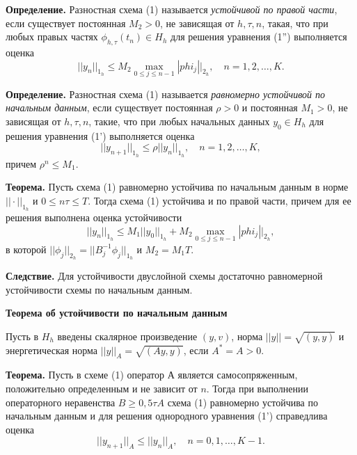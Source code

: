\textbf{Определение.}
Разностная схема (1) называется \textit{устойчивой по правой части}, если существует постоянная $M_2>0$, не зависящая от  $h,\tau ,n$, такая, что при любых правых частях $\phi_{h,\tau}(t_n) \in H_h$ для решения уравнения (1'') выполняется оценка
\begin{equation} \nonumber
||y_n||_{1_h} \leq M_2  \max_{0 \leq j \leq n-1} |phi_j||_{2_h}, \quad n=1,2,\dots ,K.
\end{equation}

\textbf{Определение.}
Разностная схема (1) называется \textit{равномерно устойчивой по начальным данным}, если существует постоянная $\rho>0$ и постоянная $M_1>0$, не зависящая от  $h,\tau ,n$, такие, что при любых начальных данных $y_0 \in H_h$ для решения уравнения (1') выполняется оценка
\begin{equation} \nonumber
||y_{n+1}||_{1_h} \leq \rho ||y_n||_{1_h}, \quad n=1,2,\dots ,K,
\end{equation}
причем $\rho^n \leq M_1.$

\textbf{Теорема.}
Пусть схема (1) равномерно устойчива по начальным данным в норме $||\cdot||_{1_h}$ и $0 \leq n\tau \leq T$. Тогда схема (1) устойчива и по правой части, причем для ее решения выполнена оценка устойчивости
\begin{equation} \nonumber
||y_n||_{1_h} \leq M_1 ||y_0||_{1_h} + M_2  \max_{0 \leq j \leq n-1} |phi_j||_{2_h},
\end{equation}
в которой $||\phi_j||_{2_h} = ||B_j^{-1} \phi_j||_{1_h}$ и $M_2=M_1 T$.

\textbf{Следствие.} Для устойчивости двуслойной схемы достаточно равномерной устойчивости схемы по начальным данным.

\par
\textbf{Теорема об устойчивости по начальным данным}

Пусть в $H_h$ введены скалярное произведение $(y,v)$, норма $||y||=\sqrt{(y,y)}$ и энергетическая норма $||y||_A=\sqrt{(Ay,y)}$, если $A^*=A>0$.

\textbf{Теорема.}
Пусть в схеме (1) оператор А является самосопряженным, положительно определенным и не зависит от $n$. Тогда при выполнении операторного неравенства $B \geq 0,5\tau A$ схема (1) равномерно устойчива по начальным данным и для решения однородного уравнения (1') справедлива оценка
\begin{equation} \nonumber
||y_{n+1}||_A \leq ||y_n||_A, \quad n=0,1,\dots , K-1.
\end{equation}

